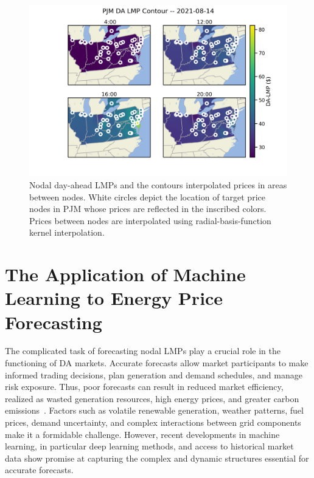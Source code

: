 \begin{figure}[htbp]
    \caption[Contour map of PJM DA LMPs at various times on a single market-day ]{
        Nodal day-ahead LMPs and the contours interpolated prices in areas between nodes.
        White circles depict the location of target price nodes in PJM whose prices are reflected in the
        inscribed colors.
        Prices between nodes are interpolated using radial-basis-function kernel interpolation.
    }
    \begin{center}
        \setlength{\fboxsep}{0pt}%
        \setlength{\fboxrule}{1pt}%
        \includegraphics[width=150mm]{figs/pjm_lmp_contour_singlecbar}
    \end{center}
    \label{fig:contours}
\end{figure}

\section{The Application of Machine Learning to Energy Price Forecasting}\label{sec:the-application-of-machine-learning-to-price-forecasting}

The complicated task of forecasting nodal LMPs play a crucial role in the functioning of DA markets.
Accurate forecasts allow market participants to make informed trading decisions, plan generation and demand schedules,
and manage risk exposure.
Thus, poor forecasts can result in reduced market efficiency, realized as wasted generation resources, high energy
prices, and greater carbon emissions~\cite{Surana2019}.
Factors such as volatile renewable generation, weather patterns, fuel prices, demand uncertainty, and complex
interactions between grid components make it a formidable challenge.
However, recent developments in machine learning, in particular deep learning methods, and access to historical market
data show promise at capturing the complex and dynamic structures essential for accurate forecasts.

